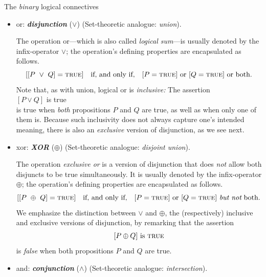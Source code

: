 \medskip

 {\small\sf The {\em binary} logical connectives}
\begin{itemize}
\item
{\sc or}: {\bf\em disjunction} ($\vee$)
\hspace*{.1in}
{\small\sf (Set-theoretic analogue: {\em union})}.

\smallskip

The operation {\sc or}---which is also called {\em logical sum}---is usually denoted by the infix-operator $\vee$; the operation's defining properties are encapsulated as follows.
\[
[[P \ \vee \ Q] =  \mbox{\sc true}] \ \ \mbox{ if, and only if, } \ \ 
[P = \mbox{\sc true}] \mbox{ or }
[Q = \mbox{\sc true}] \mbox{ or both}.
\]
Note that, as with union, logical {\sc or} is {\em inclusive:}  The assertion \\
\hspace*{.35in}$[P \vee Q]$ is \mbox{\sc true} \\
%
is true when {\em both} propositions $P$ and $Q$ are true, as well as when only one of them is.  Because such inclusivity does not always capture one's intended meaning, there is also an {\em exclusive} version of disjunction, as we see next.

\medskip\item 
{\sc xor}: {\bf\em XOR} ($\oplus$)
\hspace*{.1in}
{\small\sf (Set-theoretic analogue: {\em disjoint union})}.

\smallskip

The operation {\em exclusive or} is a version of disjunction that does {\em not} allow both disjuncts to be true simultaneously.  It is usually denoted by the infix-operator $\oplus$; the operation's defining properties are encapsulated as follows.
\[
[[P \ \oplus \ Q] =  \mbox{\sc true}] \ \ \mbox{ if, and only if, } \ \ 
[P = \mbox{\sc true}] \mbox{ or }
[Q = \mbox{\sc true}] \mbox{ {\em but not} both}.
\]
We emphasize the distinction between $\vee$ and $\oplus$, the (respectively) inclusive and exclusive versions of disjunction, by remarking that the assertion
\[
[P \oplus Q]  \mbox{ is } \mbox{\sc true}
\]
is {\em false} when both propositions $P$ and $Q$ are true.

\medskip\item
{\sc and}:  {\bf\em conjunction} ($\wedge$)
\hspace*{.1in}
{\small\sf (Set-theoretic analogue: {\em intersection})}.
\index{logical operation!conjunction ($\wedge$)}


\end{itemize}
